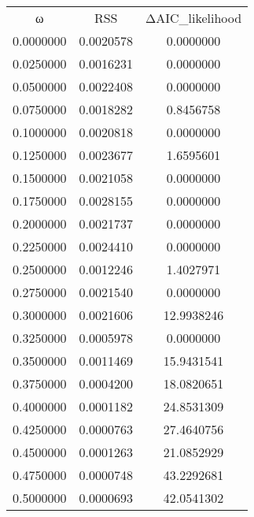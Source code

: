 \begin{tabular}{ccc}
ω & RSS & ΔAIC_likelihood\\
0.0000000 & 0.0020578 & 0.0000000\\
0.0250000 & 0.0016231 & 0.0000000\\
0.0500000 & 0.0022408 & 0.0000000\\
0.0750000 & 0.0018282 & 0.8456758\\
0.1000000 & 0.0020818 & 0.0000000\\
0.1250000 & 0.0023677 & 1.6595601\\
0.1500000 & 0.0021058 & 0.0000000\\
0.1750000 & 0.0028155 & 0.0000000\\
0.2000000 & 0.0021737 & 0.0000000\\
0.2250000 & 0.0024410 & 0.0000000\\
0.2500000 & 0.0012246 & 1.4027971\\
0.2750000 & 0.0021540 & 0.0000000\\
0.3000000 & 0.0021606 & 12.9938246\\
0.3250000 & 0.0005978 & 0.0000000\\
0.3500000 & 0.0011469 & 15.9431541\\
0.3750000 & 0.0004200 & 18.0820651\\
0.4000000 & 0.0001182 & 24.8531309\\
0.4250000 & 0.0000763 & 27.4640756\\
0.4500000 & 0.0001263 & 21.0852929\\
0.4750000 & 0.0000748 & 43.2292681\\
0.5000000 & 0.0000693 & 42.0541302\\
\end{tabular}
